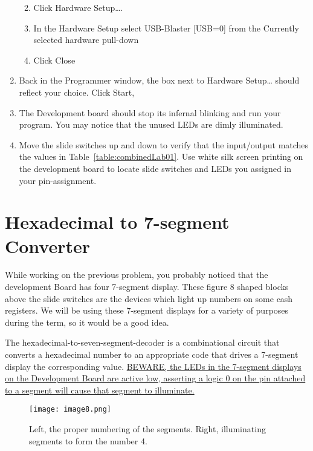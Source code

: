 \begin{enumerate}
  \begin{enumerate}
  \def\labelenumii{\alph{enumii}.}
  \item
    Click Hardware Setup\ldots.
  \item
    In the Hardware Setup select USB-Blaster {[}USB=0{]} from the
    Currently selected hardware pull-down
  \item
    Click Close
  \end{enumerate}
\item
  Back in the Programmer window, the box next to Hardware Setup\ldots{}
  should reflect your choice. Click Start,
\item
  The Development board should stop its infernal blinking and run your
  program. You may notice that the unused LEDs are dimly illuminated.
 \item 
  Move the slide switches up and down to verify that the input/output
  matches the values in Table~\ref{table:combinedLab01}.  Use white
  silk screen printing on the development board to locate slide switches and 
  LEDs you assigned in your pin-assignment.

\end{enumerate}


\section{Hexadecimal to 7-segment Converter}

While working on the previous problem, you probably noticed that the
development Board has four 7-segment display. These figure 8 shaped
blocks above the slide switches are the devices which light up numbers
on some cash registers. We will be using these 7-segment displays for a
variety of purposes during the term, so it would be a good idea.

The hexadecimal-to-seven-segment-decoder is a combinational circuit that
converts a hexadecimal number to an appropriate code that drives a
7-segment display the corresponding value. \uline{BEWARE, the LEDs in
the 7-segment displays on the Development Board are active low,
asserting a logic 0 on the pin attached to a segment will cause that
segment to illuminate.}

\begin{figure}[ht]
\texttt{[image: image8.png]}
\caption{Left, the proper numbering of the segments. Right,
illuminating segments to form the number 4.}
\label{fig:sevenSeg}
\end{figure}

